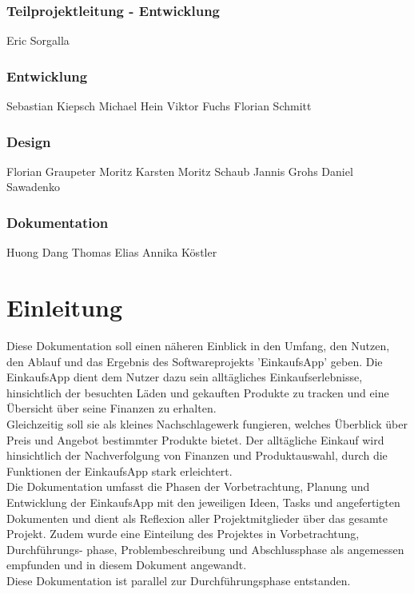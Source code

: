 \documentclass[12pt,a4paper]{article}
\begin{document}
\subsubsection*{Teilprojektleitung - Entwicklung}
Eric Sorgalla
\subsubsection*{Entwicklung}
Sebastian Kiepsch
\newline
Michael Hein
\newline
Viktor Fuchs
\newline
Florian Schmitt 
\subsubsection*{Design}
Florian Graupeter
\newline
Moritz Karsten
\newline
Moritz Schaub
\newline
Jannis Grohs
\newline
Daniel Sawadenko 
\subsubsection*{Dokumentation}
Huong Dang
\newline
Thomas Elias
\newline
Annika Köstler
\newpage


\section*{Einleitung}
Diese Dokumentation soll einen näheren Einblick in den Umfang, den Nutzen, den Ablauf und das Ergebnis des Softwareprojekts 'EinkaufsApp' geben.  
Die EinkaufsApp dient dem Nutzer dazu sein alltägliches Einkaufserlebnisse, hinsichtlich der besuchten Läden und gekauften Produkte zu tracken und eine Übersicht über seine Finanzen zu erhalten.
\\
Gleichzeitig soll sie als kleines Nachschlagewerk fungieren, welches Überblick über Preis und Angebot bestimmter Produkte bietet.
Der alltägliche Einkauf wird hinsichtlich der Nachverfolgung von Finanzen und Produktauswahl, durch die Funktionen der EinkaufsApp stark erleichtert.
\\
Die Dokumentation umfasst die Phasen der Vorbetrachtung, Planung und Entwicklung der EinkaufsApp mit den jeweiligen Ideen, Tasks und angefertigten Dokumenten und dient als Reflexion aller Projektmitglieder über das gesamte Projekt.
Zudem wurde eine Einteilung des Projektes in Vorbetrachtung, Durchführungs-
phase, Problembeschreibung und Abschlussphase als angemessen empfunden und in diesem Dokument angewandt.
\\
Diese Dokumentation ist parallel zur Durchführungsphase entstanden.
\end{document}
